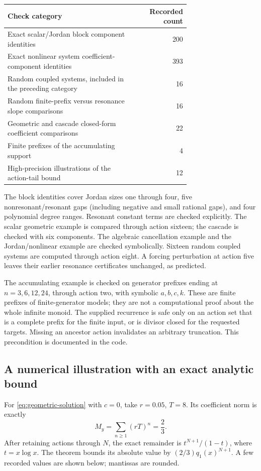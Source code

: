 \documentclass[11pt,a4paper]{article}
\numberwithin{equation}{section}
\theoremstyle{definition}
\theoremstyle{remark}
\begin{document}
\begin{center}
\begin{tabular}{@{}p{0.72\linewidth}r@{}}
\toprule
Check category & Recorded count\\
\midrule
Exact scalar/Jordan block component identities & 200\\
Exact nonlinear system coefficient-component identities & 393\\
Random coupled systems, included in the preceding category & 16\\
Random finite-prefix versus resonance slope comparisons & 16\\
Geometric and cascade closed-form coefficient comparisons & 22\\
Finite prefixes of the accumulating support & 4\\
High-precision illustrations of the action-tail bound & 12\\
\bottomrule
\end{tabular}
\end{center}

The block identities cover Jordan sizes one through four, five
nonresonant/resonant gaps (including negative and small rational
gaps), and four polynomial degree ranges. Resonant constant terms
are checked explicitly. The scalar geometric example is compared
through action sixteen; the cascade is checked with six components.
The algebraic cancellation example and the Jordan/nonlinear example
are checked symbolically. Sixteen random coupled systems are computed
through action eight. A forcing perturbation at action five leaves
their earlier resonance certificates unchanged, as predicted.

The accumulating example is checked on generator prefixes ending at
\(n=3,6,12,24\), through action two, with symbolic
\(a,b,c,k\). These are finite prefixes of finite-generator models;
they are not a computational proof about the whole infinite monoid.
The supplied recurrence is safe only on an action set that is a
complete prefix for the finite input, or is divisor closed for the
requested targets. Missing an ancestor action invalidates an
arbitrary truncation. This precondition is documented in the code.

\subsection{A numerical illustration with an exact analytic bound}
For \eqref{eq:geometric-solution} with \(c=0\), take
\(r=0.05\), \(T=8\). Its coefficient norm is exactly
\[
 M_y=\sum_{n\ge1}(rT)^n=\frac{2}{3}.
\]
After retaining actions through \(N\), the exact remainder is
\(t^{N+1}/(1-t)\), where \(t=x\log x\). The theorem bounds its
absolute value by \((2/3)q_1(x)^{N+1}\).
A few recorded values are shown below; mantissas are rounded.
\end{document}
